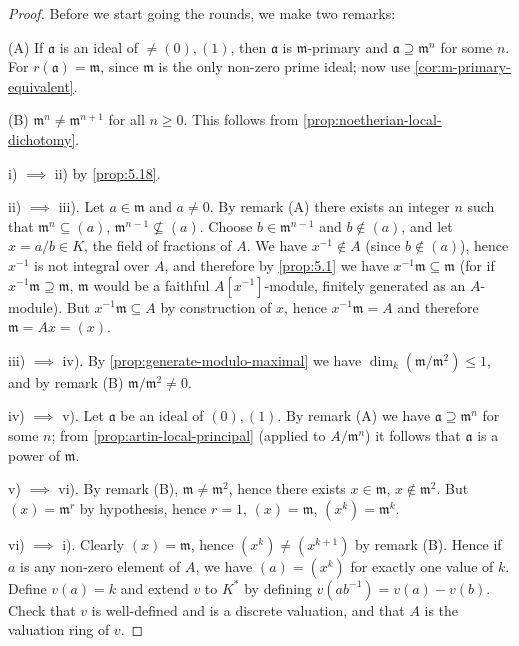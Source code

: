 \begin{proof}
Before we start going the rounds, we make two remarks:

(A) If $\mathfrak{a}$ is an ideal of $\neq (0), (1)$, then $\mathfrak{a}$ is $\mathfrak{m}$-primary and $\mathfrak{a} \supseteq \mathfrak{m}^n$ for some $n$. For $r(\mathfrak{a}) = \mathfrak{m}$, since $\mathfrak{m}$ is the only non-zero prime ideal; now use \eqref{cor:m-primary-equivalent}.

(B) $\mathfrak{m}^n \neq \mathfrak{m}^{n+1}$ for all $n \geq 0$. This follows from \eqref{prop:noetherian-local-dichotomy}.

i) $\implies$ ii) by \eqref{prop:5.18}.

ii) $\implies$ iii). Let $a \in \mathfrak{m}$ and $a \neq 0$. By remark (A) there exists an integer $n$ such that $\mathfrak{m}^n \subseteq (a)$, $\mathfrak{m}^{n-1} \not\subseteq (a)$. Choose $b \in \mathfrak{m}^{n-1}$ and $b \notin (a)$, and let $x = a/b \in K$, the field of fractions of $A$. We have $x^{-1} \notin A$ (since $b \notin (a)$), hence $x^{-1}$ is not integral over $A$, and therefore by \eqref{prop:5.1} we have $x^{-1}\mathfrak{m} \subseteq \mathfrak{m}$ (for if $x^{-1}\mathfrak{m} \supseteq \mathfrak{m}$, $\mathfrak{m}$ would be a faithful $A[x^{-1}]$-module, finitely generated as an $A$-module). But $x^{-1}\mathfrak{m} \subseteq A$ by construction of $x$, hence $x^{-1}\mathfrak{m} = A$ and therefore $\mathfrak{m} = Ax = (x)$.

iii) $\implies$ iv). By \eqref{prop:generate-modulo-maximal} we have $\dim_k(\mathfrak{m}/\mathfrak{m}^2) \leq 1$, and by remark (B) $\mathfrak{m}/\mathfrak{m}^2 \neq 0$.

iv) $\implies$ v). Let $\mathfrak{a}$ be an ideal of $(0), (1)$. By remark (A) we have $\mathfrak{a} \supseteq \mathfrak{m}^n$ for some $n$; from \eqref{prop:artin-local-principal} (applied to $A/\mathfrak{m}^n$) it follows that $\mathfrak{a}$ is a power of $\mathfrak{m}$.

v) $\implies$ vi). By remark (B), $\mathfrak{m} \neq \mathfrak{m}^2$, hence there exists $x \in \mathfrak{m}$, $x \notin \mathfrak{m}^2$. But $(x) = \mathfrak{m}^r$ by hypothesis, hence $r = 1$, $(x) = \mathfrak{m}$, $(x^k) = \mathfrak{m}^k$.

vi) $\implies$ i). Clearly $(x) = \mathfrak{m}$, hence $(x^k) \neq (x^{k+1})$ by remark (B). Hence if $a$ is any non-zero element of $A$, we have $(a) = (x^k)$ for exactly one value of $k$. Define $v(a) = k$ and extend $v$ to $K^*$ by defining $v(ab^{-1}) = v(a) - v(b)$. Check that $v$ is well-defined and is a discrete valuation, and that $A$ is the valuation ring of $v$.
\end{proof}

